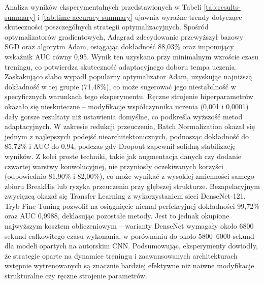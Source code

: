 Analiza wyników eksperymentalnych przedstawionych w Tabeli \ref{tab:results-summary} i \ref{tab:time-accuracy-summary} ujawnia wyraźne trendy dotyczące skuteczności poszczególnych strategii optymalizacyjnych. Spośród optymalizatorów gradientowych, Adagrad zdecydowanie przewyższył bazowy SGD oraz algorytm Adam, osiągając dokładność 88,03\% oraz imponujący wskaźnik AUC równy 0,95. Wynik ten uzyskano przy minimalnym wzroście czasu treningu, co potwierdza skuteczność adaptacyjnego doboru tempa uczenia. Zaskakująco słabo wypadł popularny optymalizator Adam, uzyskując najniższą dokładność w tej grupie (71,48\%), co może sugerować jego niestabilność w specyficznych warunkach tego eksperymentu.
Ręczne strojenie hiperparametrów okazało się nieskuteczne – modyfikacje współczynnika uczenia (0,001 i 0,0001) dały gorsze rezultaty niż ustawienia domyślne, co podkreśla wyższość metod adaptacyjnych. W zakresie redukcji przeuczenia, Batch Normalization okazał się jednym z najlepszych podejść niearchitektonicznych, podnosząc dokładność do 85,72\% i AUC do 0,94, podczas gdy Dropout zapewnił solidną stabilizację wyników. Z kolei proste techniki, takie jak augmentacja danych czy dodanie czwartej warstwy konwolucyjnej, nie przyniosły oczekiwanych korzyści (odpowiednio 81,90\% i 82,00\%), co może wynikać z wysokiej zmienności samego zbioru BreakHis lub ryzyka przeuczenia przy głębszej strukturze.
Bezapelacyjnym zwycięzcą okazał się Transfer Learning z wykorzystaniem sieci DenseNet-121. Tryb Fine-Tuning pozwolił na osiągnięcie niemal perfekcyjnej dokładności 99,72\% oraz AUC 0,9988, deklasując pozostałe metody. Jest to jednak okupione najwyższym kosztem obliczeniowym – warianty DenseNet wymagały około 6800 sekund całkowitego czasu wykonania, w porównaniu do około 5800–6000 sekund dla modeli opartych na autorskim CNN. Podsumowując, eksperymenty dowiodły, że strategie oparte na dynamice treningu i zaawansowanych architekturach wstępnie wytrenowanych są znacznie bardziej efektywne niż naiwne modyfikacje strukturalne czy ręczne strojenie parametrów.




